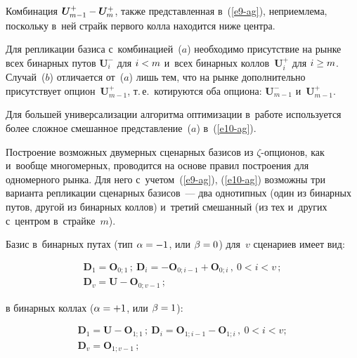\begin{multicols}{2}
  Комбинация $\boldsymbol{U}_{m-1}^+ \hm- \boldsymbol{U}_m^+$, также представленная 
в~(\ref{e9-ag}), неприемлема, поскольку в~ней страйк первого колла находится 
ниже центра. 

\pagebreak
  
  Для репликации базиса с~комбинацией~($a$) необходимо присутствие на 
рынке всех бинарных путов $\boldsymbol{U}_i^-$ для $i\hm<m$ и~всех бинарных 
коллов~$\boldsymbol{U}_i^+$ для $i\hm\geq  m$. Случай~($b$) отличается от~($a$) 
лишь тем, что на рынке дополнительно присутствует опцион~$\boldsymbol{U}^+_{m-
1}$, т.\,е.\ котируются оба опциона: $\boldsymbol{U}_{m-1}^-$ и~$\boldsymbol{U}^+_{m-1}$. 
  
  Для большей универсализации алгоритма оптимизации в~работе 
используется более сложное смешанное представление~($a$) в~(\ref{e10-ag}).
  
  Построение возможных двумерных сценарных базисов из  
$\zeta$-оп\-ци\-о\-нов, как и~вообще многомерных, проводится на основе 
правил построения для одномерного рынка. Для него с~учетом~(\ref{e9-ag}), 
(\ref{e10-ag}) возможны три варианта репликации сценарных базисов~--- два 
однотипных (один из бинарных путов, другой из бинарных коллов) и~третий 
смешанный (из тех и~других с~центром в~страйке~$m$). 
  
  Базис в~бинарных путах (тип $\alpha \hm= -1$, или $\beta\hm = 0$) для~$v$ 
сценариев имеет вид:

\vspace*{-6pt}

\noindent
  \begin{multline}
  \boldsymbol{D}_1=\boldsymbol{O}_{0;1}\,; \ \boldsymbol{D}_i= - \boldsymbol{O}_{0;i-1} +\boldsymbol{O}_{0;i}\,, \ 
0<i< v\,; \\
 \boldsymbol{D}_v= \boldsymbol{U}-\boldsymbol{O}_{0;v-1}\,;
  \label{e11-ag}
  \end{multline}
  
\vspace*{-3pt}

  \noindent
в бинарных коллах ($\alpha\hm = +1$, или $\beta\hm = 1$):

\vspace*{-6pt}

\noindent
\begin{multline}
\boldsymbol{D}_1 = \boldsymbol{U} -\boldsymbol{O}_{1;1}\,;\  \boldsymbol{D}_i=\boldsymbol{O}_{1;i-1} -
\boldsymbol{O}_{1;i}\,,\ 0<i<v;\\
 \boldsymbol{D}_v=\boldsymbol{O}_{1;v-1}\,;
\label{e12-ag}
\end{multline}


\end{multicols}
